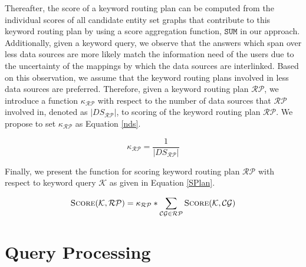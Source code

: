 Thereafter, the score of a keyword routing plan can be computed from the individual scores of all
candidate entity set graphs that contribute to this keyword routing plan by using a score aggregation
function, $\mathtt{SUM}$ in our approach. Additionally, given a keyword query, we observe that the
answers which span over less data sources are more likely match the information need of the users due
to the uncertainty of the mappings by which the data sources are interlinked. Based on this
observation, we assume that the keyword routing plans involved in less data sources are preferred.
Therefore, given a keyword routing plan $\mathcal{RP}$, we introduce a function
$\kappa_{\mathcal{RP}}$ with respect to the number of data sources that $\mathcal{RP}$ involved in,
denoted as $\left\vert{DS}_{\mathcal{RP}}\right\vert$, to scoring of the keyword routing plan
$\mathcal{RP}$. We propose to set $\kappa_{\mathcal{RP}}$ as Equation \ref{nds}.

\begin{equation}\label{nds}
\kappa_{\mathcal{RP}} = \frac{1}{\left\vert{DS}_{\mathcal{RP}}\right\vert}
\end{equation}

Finally, we present the function for scoring keyword routing plan $\mathcal{RP}$ with respect to
keyword query $\mathcal{K}$ as given in Equation \ref{SPlan}.

\begin{equation}\label{SPlan}
\textsc{Score}(\mathcal{K},\mathcal{RP}) =
\kappa_{\mathcal{RP}} * \sum_{\mathcal{CG} \in \mathcal{RP}}\textsc{Score}(\mathcal{K},\mathcal{CG})
\end{equation}

\section{Query Processing}\label{qr:queryprocess}

